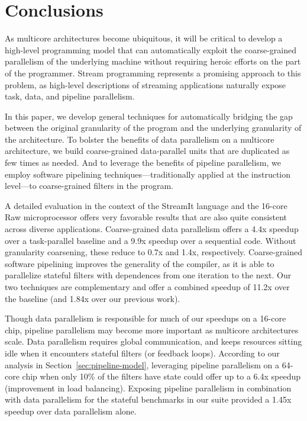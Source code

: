 \section{Conclusions}

As multicore architectures become ubiquitous, it will be critical to
develop a high-level programming model that can automatically exploit
the coarse-grained parallelism of the underlying machine without
requiring heroic efforts on the part of the programmer.  Stream
programming represents a promising approach to this problem, as
high-level descriptions of streaming applications naturally expose
task, data, and pipeline parallelism.  

In this paper, we develop general techniques for automatically
bridging the gap between the original granularity of the program and
the underlying granularity of the architecture.  To bolster the
benefits of data parallelism on a multicore architecture, we build
coarse-grained data-parallel units that are duplicated as few times as
needed.  And to leverage the benefits of pipeline parallelism, we
employ software pipelining techniques---traditionally applied at the
instruction level---to coarse-grained filters in the program.

A detailed evaluation in the context of the StreamIt language and the
16-core Raw microprocessor offers very favorable results that are also
quite consistent across diverse applications.  Coarse-grained data
parallelism offers a 4.4x speedup over a task-parallel baseline and a
9.9x speedup over a sequential code.  Without granularity coarsening,
these reduce to 0.7x and 1.4x, respectively.  Coarse-grained software
pipelining improves the generality of the compiler, as it is able to
parallelize stateful filters with dependences from one iteration to
the next.  Our two techniques are complementary and offer a combined
speedup of 11.2x over the baseline (and 1.84x over our previous work).

Though data parallelism is responsible for much of our speedups on a
16-core chip, pipeline parallelism may become more important as
multicore architectures scale.  Data parallelism requires global
communication, and keeps resources sitting idle when it encounters
stateful filters (or feedback loops).  According to our analysis in
Section~\ref{sec:pipeline-model}, leveraging pipeline parallelism on a
64-core chip when only 10\% of the filters have state could offer up
to a 6.4x speedup (improvement in load balancing).  Exposing pipeline
parallelism in combination with data parallelism for the stateful
benchmarks in our suite provided a 1.45x speedup over data parallelism
alone.

